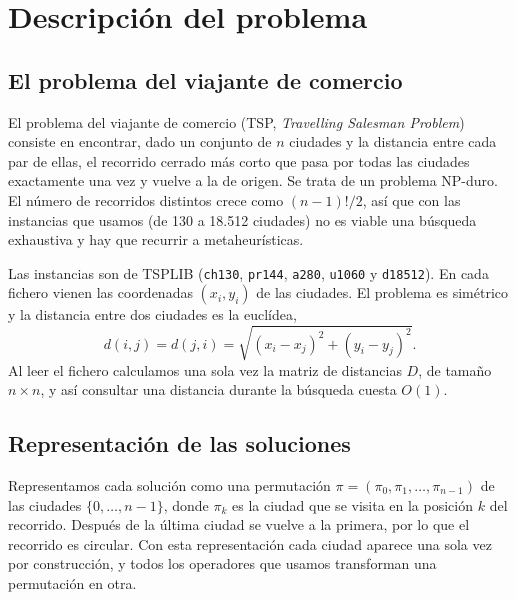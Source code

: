 
\section{Descripción del problema}

\subsection{El problema del viajante de comercio}

El problema del viajante de comercio (TSP, \textit{Travelling Salesman Problem}) consiste en encontrar, dado un conjunto de $n$ ciudades y la distancia entre cada par de ellas, el recorrido cerrado más corto que pasa por todas las ciudades exactamente una vez y vuelve a la de origen. Se trata de un problema NP-duro. El número de recorridos distintos crece como $(n-1)!/2$, así que con las instancias que usamos (de 130 a 18.512 ciudades) no es viable una búsqueda exhaustiva y hay que recurrir a metaheurísticas.

Las instancias son de TSPLIB (\texttt{ch130}, \texttt{pr144}, \texttt{a280}, \texttt{u1060} y \texttt{d18512}). En cada fichero vienen las coordenadas $(x_i, y_i)$ de las ciudades. El problema es simétrico y la distancia entre dos ciudades es la euclídea,
\begin{equation}
d(i,j) = d(j,i) = \sqrt{(x_i - x_j)^2 + (y_i - y_j)^2}.
\end{equation}
Al leer el fichero calculamos una sola vez la matriz de distancias $D$, de tamaño $n \times n$, y así consultar una distancia durante la búsqueda cuesta $O(1)$.

\subsection{Representación de las soluciones}

Representamos cada solución como una permutación $\pi = (\pi_0, \pi_1, \dots, \pi_{n-1})$ de las ciudades $\{0, \dots, n-1\}$, donde $\pi_k$ es la ciudad que se visita en la posición $k$ del recorrido. Después de la última ciudad se vuelve a la primera, por lo que el recorrido es circular. Con esta representación cada ciudad aparece una sola vez por construcción, y todos los operadores que usamos transforman una permutación en otra.


